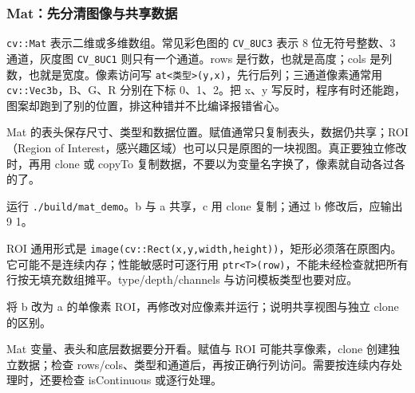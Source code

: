 \subsubsection{Mat：先分清图像与共享数据}
\texttt{cv::Mat} 表示二维或多维数组。常见彩色图的 \texttt{CV\_8UC3} 表示 8 位无符号整数、3 通道，灰度图 \texttt{CV\_8UC1} 则只有一个通道。rows 是行数，也就是高度；cols 是列数，也就是宽度。像素访问写 \texttt{at<类型>(y,x)}，先行后列；三通道像素通常用 \texttt{cv::Vec3b}，B、G、R 分别在下标 0、1、2。把 x、y 写反时，程序有时还能跑，图案却跑到了别的位置，排这种错并不比编译报错省心。

Mat 的表头保存尺寸、类型和数据位置。赋值通常只复制表头，数据仍共享；ROI（Region of Interest，感兴趣区域）也可以只是原图的一块视图。真正要独立修改时，再用 clone 或 copyTo 复制数据，不要以为变量名字换了，像素就自动各过各的了。
\begin{example}
运行 \texttt{./build/mat\_demo}。b 与 a 共享，c 用 clone 复制；通过 b 修改后，应输出 9 1。
\begin{cvblock}

\end{cvblock}
ROI 通用形式是 \texttt{image(cv::Rect(x,y,width,height))}，矩形必须落在原图内。它可能不是连续内存；性能敏感时可逐行用 \texttt{ptr<T>(row)}，不能未经检查就把所有行按无填充数组摊平。type/depth/channels 与访问模板类型也要对应。
\end{example}
\begin{exercise}\label{ex:v2-cv-mat}
将 b 改为 a 的单像素 ROI，再修改对应像素并运行；说明共享视图与独立 clone 的区别。
\end{exercise}
\begin{conclusion}
Mat 变量、表头和底层数据要分开看。赋值与 ROI 可能共享像素，clone 创建独立数据；检查 rows/cols、类型和通道后，再按正确行列访问。需要按连续内存处理时，还要检查 isContinuous 或逐行处理。
\end{conclusion}

